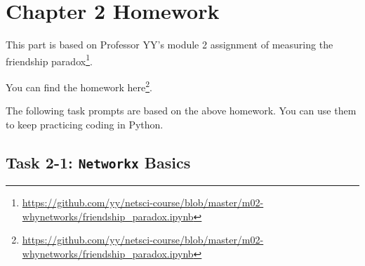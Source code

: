 \documentclass[
]{krantz}
\makeatletter
\renewcommand{\href}[2]{#2\footnote{\url{#1}}}
\newenvironment{kframe}{%
\medskip{}
\setlength{\fboxsep}{.8em}
 \def\at@end@of@kframe{}%
 \ifinner\ifhmode%
  \def\at@end@of@kframe{\end{minipage}}%
  \begin{minipage}{\columnwidth}%
 \fi\fi%
 \def\FrameCommand##1{\hskip\@totalleftmargin \hskip-\fboxsep
 \colorbox{shadecolor}{##1}\hskip-\fboxsep
     \hskip-\linewidth \hskip-\@totalleftmargin \hskip\columnwidth}%
 \MakeFramed {\advance\hsize-\width
   \@totalleftmargin\z@ \linewidth\hsize
   \@setminipage}}%
 {\par\unskip\endMakeFramed%
 \at@end@of@kframe}
\newenvironment{rmdblock}[1]
  {
  \begin{itemize}
  \renewcommand{\labelitemi}{
    \raisebox{-.7\height}[0pt][0pt]{
      {\setkeys{Gin}{width=3em,keepaspectratio}\texttt{[image: images/\#1]}}
    }
  }
  \setlength{\fboxsep}{1em}
  \begin{kframe}
  \item
  }
  {
  \end{kframe}
  \end{itemize}
  }
\newenvironment{rmdnote}
  {\begin{rmdblock}{note}}
  {\end{rmdblock}}
\makeatother
\begin{document}
\hypertarget{chapter-2-homework}{%
\section{Chapter 2 Homework}\label{chapter-2-homework}}

\begin{rmdnote}
This part is based on Professor YY's module 2 assignment of \href{https://github.com/yy/netsci-course/blob/master/m02-whynetworks/friendship_paradox.ipynb}{measuring the friendship paradox}.
\end{rmdnote}

You can find the homework \href{https://github.com/yy/netsci-course/blob/master/m02-whynetworks/friendship_paradox.ipynb}{here}.

The following task prompts are based on the above homework. You can use them to keep practicing coding in Python.

\hypertarget{task-2-1-networkx-basics}{%
\subsection{\texorpdfstring{Task 2-1: \texttt{Networkx} Basics}{Task 2-1: Networkx Basics}}\label{task-2-1-networkx-basics}}
\end{document}
